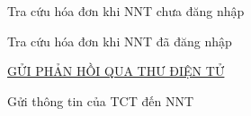 Tra cứu hóa đơn khi NNT chưa đăng nhập



















Tra cứu hóa đơn khi NNT đã đăng nhập



















\underline{\textsc{ GỬI PHẢN HỒI QUA THƯ ĐIỆN TỬ}}



















Gửi thông tin của TCT đến NNT